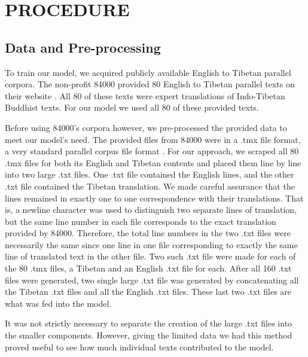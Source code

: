 \documentclass[letterpaper, 12 pt, conference]{ieeeconf}  %
\begin{document}
\section{PROCEDURE}


\subsection{Data and Pre-processing}

To train our model, we acquired publicly available English to Tibetan parallel corpora. The non-profit 84000 provided 80 English to Tibetan parallel texts on their website \cite{c8}. All 80 of these texts were expert translations of Indo-Tibetan Buddhist texts. For our model we used all 80 of these provided texts.

Before using 84000's corpora however, we pre-processed the provided data to meet our model's need. The provided files from 84000 were in a .tmx file format, a very standard parallel corpus file format \cite{c9}. 
For our approach, we scraped all 80 .tmx files for both its English and Tibetan contents and placed them line by line into two large .txt files. One .txt file contained the English lines, and the other .txt file contained the Tibetan translation. We made careful assurance that the lines remained in exactly one to one correspondence with their translations. That is, a newline character was used to distinguish two separate lines of translation, but the same line number in each file corresponds to the exact translation provided by 84000. Therefore, the total line numbers in the two .txt files were necessarily the same since one line in one file corresponding to exactly the same line of translated text in the other file. Two such .txt file were made for each of the 80 .tmx files, a Tibetan and an English .txt file for each. After all 160 .txt files were generated, two single large .txt file was generated by concatenating all the Tibetan .txt files and all the English .txt files. These last two .txt files are what was fed into the model.

It was not strictly necessary to separate the creation of the large .txt files into the smaller components. However, giving the limited data we had this method proved useful to see how much individual texts contributed to the model. 
\end{document}
